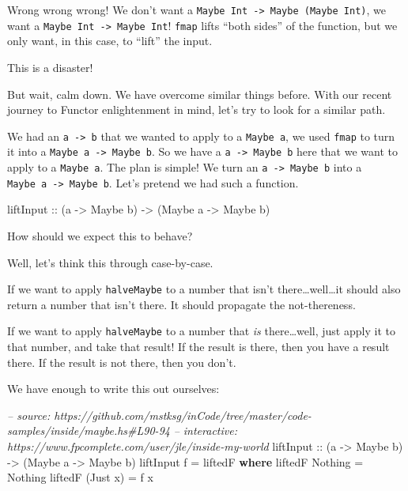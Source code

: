 \documentclass[]{article}
\newenvironment{Shaded}{}{}
\newcommand{\KeywordTok}[1]{\textcolor[rgb]{0.00,0.44,0.13}{\textbf{{#1}}}}
\newcommand{\DataTypeTok}[1]{\textcolor[rgb]{0.56,0.13,0.00}{{#1}}}
\newcommand{\CommentTok}[1]{\textcolor[rgb]{0.38,0.63,0.69}{\textit{{#1}}}}
\newcommand{\OtherTok}[1]{\textcolor[rgb]{0.00,0.44,0.13}{{#1}}}
\newcommand{\FunctionTok}[1]{\textcolor[rgb]{0.02,0.16,0.49}{{#1}}}
\newcommand{\NormalTok}[1]{{#1}}
\begin{document}
Wrong wrong wrong! We don't want a
\texttt{Maybe\ Int\ -\textgreater{}\ Maybe\ (Maybe\ Int)}, we want a
\texttt{Maybe\ Int\ -\textgreater{}\ Maybe\ Int}! \texttt{fmap} lifts
``both sides'' of the function, but we only want, in this case, to
``lift'' the input.

This is a disaster!

But wait, calm down. We have overcome similar things before. With our
recent journey to Functor enlightenment in mind, let's try to look for a
similar path.

We had an \texttt{a\ -\textgreater{}\ b} that we wanted to apply to a
\texttt{Maybe\ a}, we used \texttt{fmap} to turn it into a
\texttt{Maybe\ a\ -\textgreater{}\ Maybe\ b}. So we have a
\texttt{a\ -\textgreater{}\ Maybe\ b} here that we want to apply to a
\texttt{Maybe\ a}. The plan is simple! We turn an
\texttt{a\ -\textgreater{}\ Maybe\ b} into a
\texttt{Maybe\ a\ -\textgreater{}\ Maybe\ b}. Let's pretend we had such
a function.

\begin{Shaded}
\begin{Highlighting}[]
\OtherTok{liftInput ::} \NormalTok{(a }\OtherTok{->} \DataTypeTok{Maybe} \NormalTok{b) }\OtherTok{->} \NormalTok{(}\DataTypeTok{Maybe} \NormalTok{a }\OtherTok{->} \DataTypeTok{Maybe} \NormalTok{b)}
\end{Highlighting}
\end{Shaded}

How should we expect this to behave?

Well, let's think this through case-by-case.

If we want to apply \texttt{halveMaybe} to a number that isn't
there\ldots{}well\ldots{}it should also return a number that isn't
there. It should propagate the not-thereness.

If we want to apply \texttt{halveMaybe} to a number that \emph{is}
there\ldots{}well, just apply it to that number, and take that result!
If the result is there, then you have a result there. If the result is
not there, then you don't.

We have enough to write this out ourselves:

\begin{Shaded}
\begin{Highlighting}[]
\CommentTok{-- source: https://github.com/mstksg/inCode/tree/master/code-samples/inside/maybe.hs#L90-94}
\CommentTok{-- interactive: https://www.fpcomplete.com/user/jle/inside-my-world}
\OtherTok{liftInput ::} \NormalTok{(a }\OtherTok{->} \DataTypeTok{Maybe} \NormalTok{b) }\OtherTok{->} \NormalTok{(}\DataTypeTok{Maybe} \NormalTok{a }\OtherTok{->} \DataTypeTok{Maybe} \NormalTok{b)}
\NormalTok{liftInput f }\FunctionTok{=} \NormalTok{liftedF}
  \KeywordTok{where}
    \NormalTok{liftedF }\DataTypeTok{Nothing}  \FunctionTok{=} \DataTypeTok{Nothing}
    \NormalTok{liftedF (}\DataTypeTok{Just} \NormalTok{x) }\FunctionTok{=} \NormalTok{f x}
\end{Highlighting}
\end{Shaded}
\end{document}
